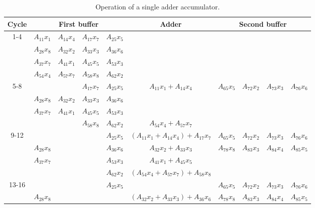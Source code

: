 \begin{sidewaystable}
    \centering
    \caption{Operation of a single adder accumulator.}
    \label{tbl:single_adder}
    \begin{tabular}{|c||c|c|c|c||c||c|c|c|c|}
        \hline
        Cycle & \multicolumn{4}{c||}{First buffer} & Adder & \multicolumn{4}{c|}{Second buffer} \\
        \hline
        \hline
        \multirow{4}{*}{1-4} & $A_{11}x_1$ & $A_{14}x_4$ & $A_{17}x_7$ & $A_{25}x_5$ & & & & & \\
        \cline{2-10}
        & $A_{28}x_8$ & $A_{32}x_2$ & $A_{33}x_3$ & $A_{36}x_6$ & & & & & \\
        \cline{2-10}
        & $A_{37}x_7$ & $A_{41}x_1$ & $A_{45}x_5$ & $A_{53}x_3$ & & & & & \\
        \cline{2-10}
        & $A_{54}x_4$ & $A_{57}x_7$ & $A_{58}x_8$ & $A_{62}x_2$ & & & & & \\
        \hline
        \hline
        \multirow{4}{*}{5-8} & & & $A_{17}x_7$ & $A_{25}x_5$ & $A_{11}x_1 + A_{14}x_4$ & $A_{65}x_5$ & $A_{72}x_2$ & $A_{73}x_3$ & $A_{76}x_6$ \\
        \cline{2-10}
        & $A_{28}x_8$ & $A_{32}x_2$ & $A_{33}x_3$ & $A_{36}x_6$ & & & & & \\
        \cline{2-10}
        & $A_{37}x_7$ & $A_{41}x_1$ & $A_{45}x_5$ & $A_{53}x_3$ & & & & & \\
        \cline{2-10}
        & & & $A_{58}x_8$ & $A_{62}x_2$ & $A_{54}x_4 + A_{57}x_7$ & & & & \\
        \hline
        \hline
        \multirow{4}{*}{9-12} & & & & $A_{25}x_5$ & $\left(A_{11}x_1 + A_{14}x_4\right) + A_{17}x_7$ & $A_{65}x_5$ & $A_{72}x_2$ & $A_{73}x_3$ & $A_{76}x_6$ \\
        \cline{2-10}
        & $A_{28}x_8$ & & & $A_{36}x_6$ & $A_{32}x_2 + A_{33}x_3$ & $A_{78}x_8$ & $A_{83}x_3$ & $A_{84}x_4$ & $A_{85}x_5$\\
        \cline{2-10}
        & $A_{37}x_7$ & & & $A_{53}x_3$ & $A_{41}x_1 + A_{45}x_5$ & & & & \\
        \cline{2-10}
        & & & & $A_{62}x_2$ & $\left(A_{54}x_4 + A_{57}x_7\right) + A_{58}x_8$ & & & & \\
        \hline
        \hline
        \multirow{4}{*}{13-16} & & & & $A_{25}x_5$ & & $A_{65}x_5$ & $A_{72}x_2$ & $A_{73}x_3$ & $A_{76}x_6$ \\
        \cline{2-10}
        & $A_{28}x_8$ & & & & $\left(A_{32}x_2 + A_{33}x_3\right) + A_{36}x_6$ & $A_{78}x_8$ & $A_{83}x_3$ & $A_{84}x_4$ & $A_{85}x_5$\\

\end{tabular}
\end{sidewaystable}
